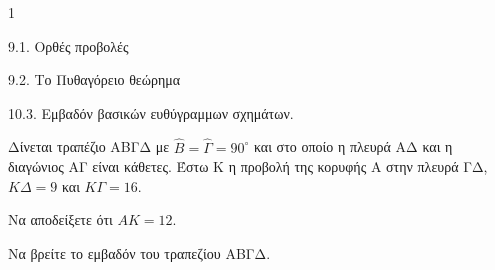\begin{ylh}{1}
    \item 9.1. Ορθές προβολές
    \item 9.2. Το Πυθαγόρειο θεώρημα
    \item 10.3. Εμβαδόν βασικών ευθύγραμμων σχημάτων.
\end{ylh}
\begin{figure} %
\end{figure}
Δίνεται τραπέζιο ΑΒΓΔ με $\hat{B} = \hat{\Gamma} = 90^\circ$ και στο οποίο η πλευρά ΑΔ και η διαγώνιος ΑΓ είναι κάθετες. Έστω Κ η προβολή της κορυφής Α στην πλευρά ΓΔ, $K\Delta = 9$ και $K\Gamma = 16$.
\begin{alist}
\item Να αποδείξετε ότι $AK = 12$. 
\item Να βρείτε το εμβαδόν του τραπεζίου ΑΒΓΔ. 
\end{alist}
